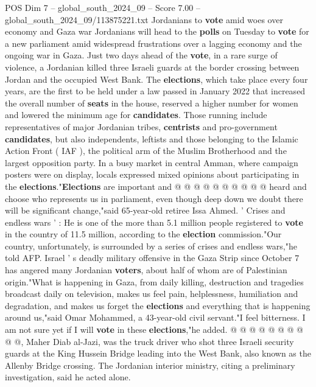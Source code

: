 \begin{textsample}{POS Dim 7 – global\_south\_2024\_09 – Score 7.00 – global\_south\_2024\_09/113875221.txt}  \label{ex:f7_pos_231}
Jordanians to \textbf{vote} amid woes over economy and Gaza war Jordanians will head to the \textbf{polls} on Tuesday to \textbf{vote} for a new parliament amid widespread frustrations over a lagging economy and the ongoing war in Gaza.
Just two days ahead of the \textbf{vote}, in a rare surge of violence, a Jordanian killed three Israeli guards at the border crossing between Jordan and the occupied West Bank.
The \textbf{elections}, which take place every four years, are the first to be held under a law passed in January 2022 that increased the overall number of \textbf{seats} in the house, reserved a higher number for women and lowered the minimum age for \textbf{candidates}.
Those running include representatives of major Jordanian tribes, \textbf{centrists} and pro-government \textbf{candidates}, but also independents, leftists and those belonging to the Islamic Action Front ( IAF ), the political arm of the Muslim Brotherhood and the largest opposition party.
In a busy market in central Amman, where campaign posters were on display, locals expressed mixed opinions about participating in the \textbf{elections}."\textbf{Elections} are important and @ @ @ @ @ @ @ @ @ @ heard and choose who represents us in parliament, even though deep down we doubt there will be significant change,"said 65-year-old retiree Issa Ahmed. ' Crises and endless wars ' : He is one of the more than 5.1 million people registered to \textbf{vote} in the country of 11.5 million, according to the \textbf{election} commission."Our country, unfortunately, is surrounded by a series of crises and endless wars,"he told AFP.
Israel ' s deadly military offensive in the Gaza Strip since October 7 has angered many Jordanian \textbf{voters}, about half of whom are of Palestinian origin."What is happening in Gaza, from daily killing, destruction and tragedies broadcast daily on television, makes us feel pain, helplessness, humiliation and degradation, and makes us forget the \textbf{elections} and everything that is happening around us,"said Omar Mohammed, a 43-year-old civil servant."I feel bitterness.
I am not sure yet if I will \textbf{vote} in these \textbf{elections},"he added. @ @ @ @ @ @ @ @ @ @, Maher Diab al-Jazi, was the truck driver who shot three Israeli security guards at the King Hussein Bridge leading into the West Bank, also known as the Allenby Bridge crossing.
The Jordanian interior ministry, citing a preliminary investigation, said he acted alone.

\end{textsample}
